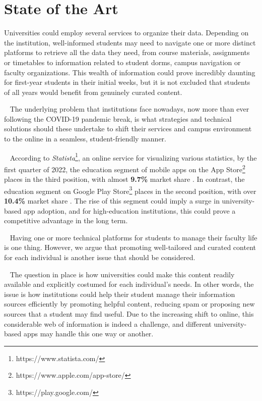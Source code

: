 \chapter{State of the Art} \label{chapter2}

Universities could employ several services to organize their data. Depending on the institution, well-informed students may need to navigate one or more distinct platforms to retrieve all the data they need, from course materials, assignments or timetables to information related to student dorms, campus navigation or faculty organizations. This wealth of information could prove incredibly daunting for first-year students in their initial weeks, but it is not excluded that students of all years would benefit from genuinely curated content.

~
The underlying problem that institutions face nowadays, now more than ever following the COVID-19 pandemic break, is what strategies and technical solutions should these undertake to shift their services and campus environment to the online in a seamless, student-friendly manner.

~
According to \textit{Statista}\footnote{https://www.statista.com/}, an online service for visualizing various statistics, by the first quarter of 2022, the education segment of mobile apps on the App Store\footnote{https://www.apple.com/app-store/} places in the third position, with almost \textbf{9.7\%} market share \cite{marketshare_apps_apple}. In contrast, the education segment on Google Play Store\footnote{https://play.google.com/} places in the second position, with over \textbf{10.4\%} market share \cite{marketshare_apps_android}. The rise of this segment could imply a surge in university-based app adoption, and for high-education institutions, this could prove a competitive advantage in the long term.

~
Having one or more technical platforms for students to manage their faculty life is one thing. However, we argue that promoting well-tailored and curated content for each individual is another issue that should be considered. 

~
The question in place is how universities could make this content readily available and explicitly costumed for each individual's needs. In other words, the issue is how institutions could help their student manage their information sources efficiently by promoting helpful content, reducing spam or proposing new sources that a student may find useful. Due to the increasing shift to online, this considerable web of information is indeed a challenge, and different university-based apps may handle this one way or another.


